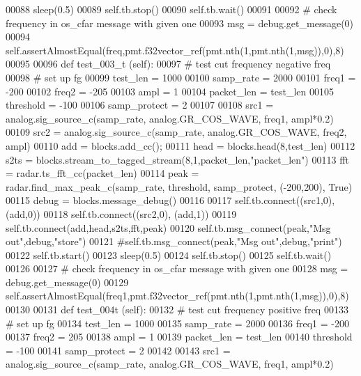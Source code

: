 \begin{DoxyCode}
00088         sleep(0.5)
00089         self.tb.stop()
00090         self.tb.wait()
00091         
00092         \textcolor{comment}{# check frequency in os\_cfar message with given one}
00093         msg = debug.get\_message(0)
00094         self.assertAlmostEqual(freq,pmt.f32vector\_ref(pmt.nth(1,pmt.nth(1,msg)),0),8)
00095         
00096     \textcolor{keyword}{def }test_003_t (self):
00097         \textcolor{comment}{# test cut frequency negative freq}
00098         \textcolor{comment}{# set up fg}
00099         test\_len = 1000
00100         samp\_rate = 2000
00101         freq1 = -200
00102         freq2 = -205
00103         ampl = 1
00104         packet\_len = test\_len
00105         threshold = -100
00106         samp\_protect = 2
00107         
00108         src1 = analog.sig\_source\_c(samp\_rate, analog.GR\_COS\_WAVE, freq1, ampl*0.2)
00109         src2 = analog.sig\_source\_c(samp\_rate, analog.GR\_COS\_WAVE, freq2, ampl)
00110         add = blocks.add\_cc();
00111         head = blocks.head(8,test\_len)
00112         s2ts = blocks.stream\_to\_tagged\_stream(8,1,packet\_len,\textcolor{stringliteral}{"packet\_len"})
00113         fft = radar.ts\_fft\_cc(packet\_len)
00114         peak = radar.find\_max\_peak\_c(samp\_rate, threshold, samp\_protect, (-200,200), \textcolor{keyword}{True})
00115         debug = blocks.message\_debug()
00116         
00117         self.tb.connect((src1,0), (add,0))
00118         self.tb.connect((src2,0), (add,1))
00119         self.tb.connect(add,head,s2ts,fft,peak)
00120         self.tb.msg\_connect(peak,\textcolor{stringliteral}{"Msg out"},debug,\textcolor{stringliteral}{"store"})
00121         \textcolor{comment}{#self.tb.msg\_connect(peak,"Msg out",debug,"print")}
00122         self.tb.start()
00123         sleep(0.5)
00124         self.tb.stop()
00125         self.tb.wait()
00126         
00127         \textcolor{comment}{# check frequency in os\_cfar message with given one}
00128         msg = debug.get\_message(0)
00129         self.assertAlmostEqual(freq1,pmt.f32vector\_ref(pmt.nth(1,pmt.nth(1,msg)),0),8)
00130         
00131     \textcolor{keyword}{def }test_004t (self):
00132         \textcolor{comment}{# test cut frequency positive freq}
00133         \textcolor{comment}{# set up fg}
00134         test\_len = 1000
00135         samp\_rate = 2000
00136         freq1 = -200
00137         freq2 = 205
00138         ampl = 1
00139         packet\_len = test\_len
00140         threshold = -100
00141         samp\_protect = 2
00142         
00143         src1 = analog.sig\_source\_c(samp\_rate, analog.GR\_COS\_WAVE, freq1, ampl*0.2)

\end{DoxyCode}
